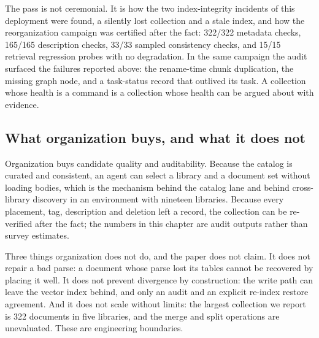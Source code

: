 The pass is not ceremonial. It is how the two index-integrity incidents of
this deployment were found, a silently lost collection and a stale index, and
how the reorganization campaign was certified after the fact: 322/322
metadata checks, 165/165 description checks, 33/33 sampled consistency
checks, and 15/15 retrieval regression probes with no degradation. In the
same campaign the audit surfaced the failures reported above: the rename-time
chunk duplication, the missing graph node, and a task-status record that
outlived its task. A collection whose health is a command is a collection
whose health can be argued about with evidence.

\subsection{What organization buys, and what it does not}
\label{sec:org-summary}

Organization buys candidate quality and auditability. Because the catalog is
curated and consistent, an agent can select a library and a document set
without loading bodies, which is the mechanism behind the catalog lane and
behind cross-library discovery in an environment with nineteen libraries.
Because every placement, tag, description and deletion left a record, the
collection can be re-verified after the fact; the numbers in this chapter are
audit outputs rather than survey estimates.

Three things organization does not do, and the paper does not claim. It does
not repair a bad parse: a document whose parse lost its tables cannot be
recovered by placing it well. It does not prevent divergence by construction:
the write path can leave the vector index behind, and only an audit and an
explicit re-index restore agreement. And it does not scale without limits:
the largest collection we report is 322 documents in five libraries, and the
merge and split operations are unevaluated. These are engineering boundaries.
